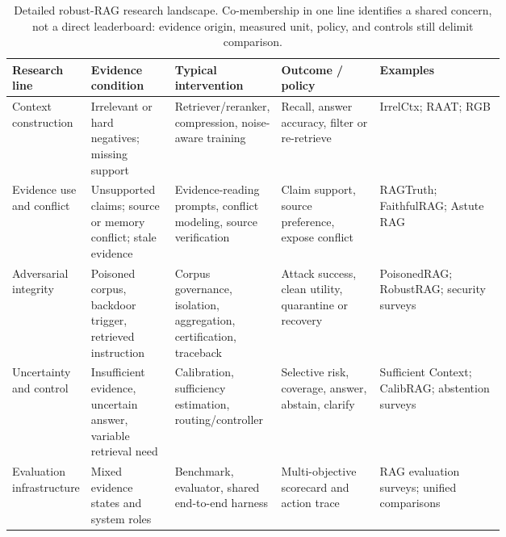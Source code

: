 \begin{table}[t]
\centering
\small
\setlength{\tabcolsep}{4pt}
\renewcommand{\arraystretch}{0.95}
\begin{tabularx}{\linewidth}{>{\raggedright\arraybackslash}p{0.14\linewidth}>{\raggedright\arraybackslash}p{0.17\linewidth}>{\raggedright\arraybackslash}p{0.20\linewidth}>{\raggedright\arraybackslash}p{0.20\linewidth}X}
\toprule
\textbf{Research line} & \textbf{Evidence condition} & \textbf{Typical intervention} & \textbf{Outcome / policy} & \textbf{Examples} \\
\midrule
Context construction & Irrelevant or hard negatives; missing support & Retriever/reranker, compression, noise-aware training & Recall, answer accuracy, filter or re-retrieve & IrrelCtx; RAAT; RGB \\
Evidence use and conflict & Unsupported claims; source or memory conflict; stale evidence & Evidence-reading prompts, conflict modeling, source verification & Claim support, source preference, expose conflict & RAGTruth; FaithfulRAG; Astute RAG \\
Adversarial integrity & Poisoned corpus, backdoor trigger, retrieved instruction & Corpus governance, isolation, aggregation, certification, traceback & Attack success, clean utility, quarantine or recovery & PoisonedRAG; RobustRAG; security surveys \\
Uncertainty and control & Insufficient evidence, uncertain answer, variable retrieval need & Calibration, sufficiency estimation, routing/controller & Selective risk, coverage, answer, abstain, clarify & Sufficient Context; CalibRAG; abstention surveys \\
Evaluation infrastructure & Mixed evidence states and system roles & Benchmark, evaluator, shared end-to-end harness & Multi-objective scorecard and action trace & RAG evaluation surveys; unified comparisons \\
\bottomrule
\end{tabularx}
\caption{Detailed robust-RAG research landscape. Co-membership in one line identifies a shared concern, not a direct leaderboard: evidence origin, measured unit, policy, and controls still delimit comparison.}
\label{tab:research-landscape-detailed}
\end{table}
